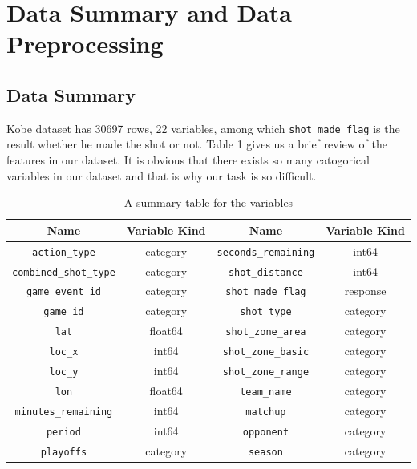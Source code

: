 \documentclass[a4paper,11pt,onecolumn,twoside]{article}
\begin{document}
\section{Data Summary and Data Preprocessing}
\subsection{Data Summary}
Kobe dataset has 30697 rows, 22 variables, among which \texttt{shot\_made\_flag} is the result whether he made the shot or not. Table 1 gives us a brief review of the features in our dataset. It is obvious that there exists so many catogorical variables in our dataset and that is why our task is so difficult.\par
\begin{table}[htbp]
	\centering
	\begin{tabular}{cccc}
		\midrule[1.5pt]
		\textbf{Name} &\textbf{Variable Kind}  &\textbf{Name}&\textbf{Variable Kind}\\
		\hline
	\texttt{action\_type} &category	&\texttt{seconds\_remaining}       &  int64			\\
    \texttt{combined\_shot\_type} &category	&\texttt{shot\_distance}     &   int64		\\
		\texttt{game\_event\_id}    &category	&\texttt{shot\_made\_flag}      			&response\\
		\texttt{game\_id}                     &category	&\texttt{shot\_type}                   &category	\\
		\texttt{lat}                         & float64	&\texttt{shot\_zone\_area}              &category		\\
		\texttt{loc\_x}                       &   int64&	\texttt{shot\_zone\_basic}             &category		\\
		\texttt{loc\_y}                       &   int64	&\texttt{shot\_zone\_range}             &category	\\
		\texttt{lon}                         & float64	&\texttt{team\_name}                   &category		\\
		\texttt{minutes\_remaining}           &   int64	&	\texttt{matchup}                     &category		\\
		\texttt{period}                      &   int64	&\texttt{opponent}                    &category		\\
		\texttt{playoffs}                    &category	&	
		\texttt{season}                      &category		\\	
		\midrule[1.5pt]
	\end{tabular}
	\caption{A summary table for the variables }
\end{table}
\end{document}
